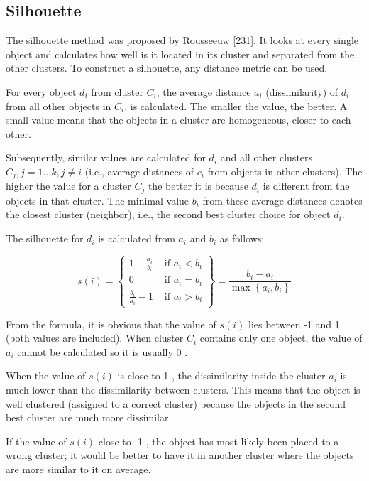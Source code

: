 \documentclass[11pt,openany,executivepaper]{book}
\begin{document}
\subsection*{Silhouette}
The silhouette method was proposed by Rousseeuw [231]. It looks at every single object and calculates how well is it located in its cluster and separated from the other clusters. To construct a silhouette, any distance metric can be used.

For every object $d_{i}$ from cluster $C_{i}$, the average distance $a_{i}$ (dissimilarity) of $d_{i}$ from all other objects in $C_{i}$, is calculated. The smaller the value, the better. A small value means that the objects in a cluster are homogeneous, closer to each other.

Subsequently, similar values are calculated for $d_{i}$ and all other clusters $C_{j}, j=1 \ldots k, j \neq i$ (i.e., average distances of $c_{i}$ from objects in other clusters). The higher the value for a cluster $C_{j}$ the better it is because $d_{i}$ is different from the objects in that cluster. The minimal value $b_{i}$ from these average distances denotes the closest cluster (neighbor), i.e., the second best cluster choice for object $d_{i}$.

The silhouette for $d_{i}$ is calculated from $a_{i}$ and $b_{i}$ as follows:

\[
s(i)=\left\{\begin{array}{ll}
1-\frac{a_{i}}{b_{i}} & \text { if } a_{i}<b_{i}  \tag{12.55}\\
0 & \text { if } a_{i}=b_{i} \\
\frac{b_{i}}{a_{i}}-1 & \text { if } a_{i}>b_{i}
\end{array}\right\}=\frac{b_{i}-a_{i}}{\max \left\{a_{i}, b_{i}\right\}}
\]

From the formula, it is obvious that the value of $s(i)$ lies between -1 and 1 (both values are included). When cluster $C_{i}$ contains only one object, the value of $a_{i}$ cannot be calculated so it is usually 0 .

When the value of $s(i)$ is close to 1 , the dissimilarity inside the cluster $a_{i}$ is much lower than the dissimilarity between clusters. This means that the object is well clustered (assigned to a correct cluster) because the objects in the second best cluster are much more dissimilar.

If the value of $s(i)$ close to -1 , the object has most likely been placed to a wrong cluster; it would be better to have it in another cluster where the objects are more similar to it on average.
\end{document}
